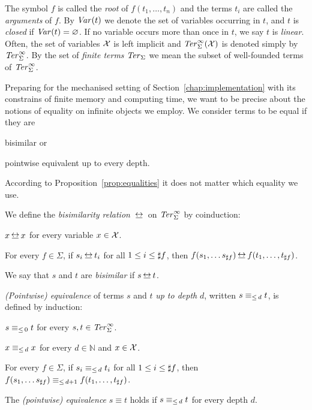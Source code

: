 The symbol $f$ is called the \emph{root} of $f(t_1, \ldots, t_n)$ and
the terms $t_i$ are called the \emph{arguments} of $f$. By $\mathit{Var}(t)$
we denote the set of variables occurring in $t$, and $t$ is
\emph{closed} if $\mathit{Var}(t) = \varnothing$. If no variable occurs more than
once in $t$, we say $t$ is \emph{linear}. Often, the set of variables
$\mathcal{X}$ is left implicit and $\mathit{Ter}_\Sigma^\infty(\mathcal{X})$ is denoted simply by $\mathit{Ter}_\Sigma^\infty$. By
the set of \emph{finite terms} $\mathit{Ter}_\Sigma$ we mean the subset of
well-founded terms of $\mathit{Ter}_\Sigma^\infty$.

Preparing for the mechanised setting of Section~\ref{chap:implementation} with
its constrains of finite memory and computing time, we want to be precise
about the notions of equality on infinite objects we employ. We consider terms
to be equal if they are
\begin{inparaenum}[(i)]
  \item bisimilar or
  \item pointwise equivalent up to every depth.
\end{inparaenum}
According to Proposition~\ref{prop:equalities} it does not matter
which equality we use.

\begin{definition}\label{def:bisimilarity}%
We define the \emph{bisimilarity relation} $\bis$ on $\mathit{Ter}_\Sigma^\infty$ by
coinduction:
\begin{compactenum}
  \item
    $x \bis x$ for every variable $x \in \mathcal{X}$.
  \item
    For every $f \in \Sigma$, if $s_i \bis t_i$ for all $1 \leq i \leq
    \sharp f$, then $f(s_1, \ldots s_{\arity{f}}) \bis f(t_1, \ldots,
    t_{\arity{f}})$.
\end{compactenum}
We say that $s$ and $t$ are \emph{bisimilar} if $s \bis t$.
\end{definition}

\begin{definition}\label{def:equiv}%
\emph{(Pointwise) equivalence} of terms $s$ and $t$ \emph{up to depth} $d$,
written $s \equiv_{\le \, d} t$, is defined by induction:
\begin{compactenum}
  \item $s \equiv_{\le \, 0} t$ for every $s, t \in \mathit{Ter}_\Sigma^\infty$.
  \item $x \equiv_{\le \, d} x$ for every $d \in \mathbb{N}$ and $x \in \mathcal{X}$.
  \item For every $f \in \Sigma$, if $s_i \equiv_{\le \, d} t_i$ for all $1 \leq i
    \leq \sharp f$, then $f(s_1, \ldots s_{\sharp f}) \equiv_{\le \, d+1}
    f(t_1, \ldots, t_{\sharp f})$.
\end{compactenum}
The \emph{(pointwise) equivalence} $s \equiv t$ holds if $s \equiv_{\le \, d}
t$ for every depth $d$.
\end{definition}


